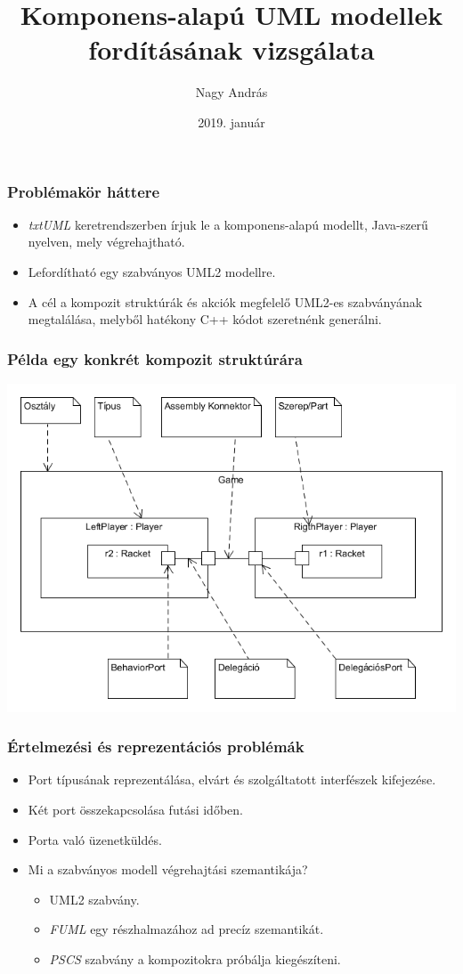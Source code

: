 \documentclass[11pt]{beamer}
\author{Nagy András}
\title{Komponens-alapú UML modellek fordításának vizsgálata}
\date{2019. január}
\begin{document}
\begin{frame}
\titlepage
\end{frame}

\begin{frame}[fragile]
	\frametitle{Problémakör háttere}
	
	\begin{itemize}
		\item \textit{txtUML} keretrendszerben írjuk le a komponens-alapú modellt, Java-szerű nyelven, mely végrehajtható.
		\item Lefordítható egy szabványos UML2 modellre.
		\item A cél a kompozit struktúrák és akciók megfelelő UML2-es szabványának megtalálása, melyből hatékony C++ kódot szeretnénk generálni.
	\end{itemize}
	
\end{frame}


\begin{frame}[fragile]
	\frametitle{Példa egy konkrét kompozit struktúrára}	
	\includegraphics[scale=0.4]{vedes_demo.png}	
	
\end{frame}

\begin{frame}[fragile]	
	\frametitle{Értelmezési és reprezentációs problémák}	
	\begin{itemize}
	\item Port típusának reprezentálása, elvárt és szolgáltatott interfészek kifejezése.
	\item Két port összekapcsolása futási időben.
	\item Porta való üzenetküldés.
	\item Mi a szabványos modell végrehajtási szemantikája?
	\begin{itemize}
		\item UML2 szabvány.
		\item \textit{FUML} egy részhalmazához ad precíz szemantikát.
		\item \textit{PSCS} szabvány a kompozitokra próbálja kiegészíteni.
	\end{itemize}
	\end{itemize}
	
\end{frame}
\end{document}
